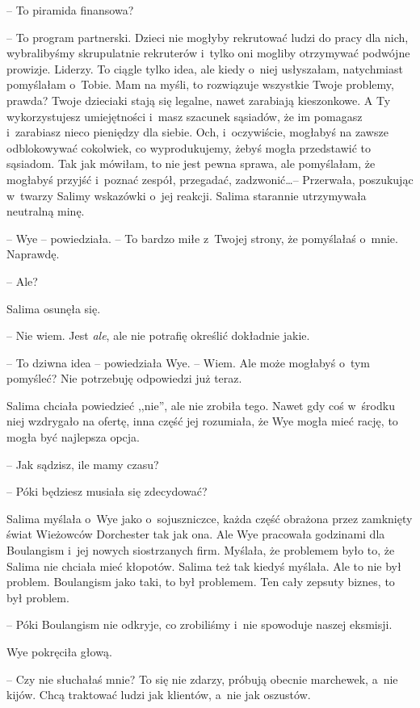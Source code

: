 \documentclass[oneside,polish,11pt,sfheadings]{mwbk}
\begin{document}
-- To piramida finansowa?

-- To program partnerski. Dzieci nie mogłyby rekrutować ludzi do pracy
dla nich, wybralibyśmy skrupulatnie rekruterów i~tylko oni mogliby
otrzymywać podwójne prowizje. Liderzy. To ciągle tylko idea, ale kiedy o~niej usłyszałam, natychmiast pomyślałam o~Tobie. Mam na myśli, to
rozwiązuje wszystkie Twoje problemy, prawda? Twoje dzieciaki stają się
legalne, nawet zarabiają kieszonkowe. A Ty wykorzystujesz umiejętności i~masz szacunek sąsiadów, że im pomagasz i~zarabiasz nieco pieniędzy dla
siebie. Och, i~oczywiście, mogłabyś na zawsze odblokowywać cokolwiek, co
wyprodukujemy, żebyś mogła przedstawić to sąsiadom. Tak jak mówiłam, to
nie jest pewna sprawa, ale pomyślałam, że mogłabyś przyjść i~poznać
zespół, przegadać, zadzwonić\ldots  -- Przerwała, poszukując w~twarzy Salimy
wskazówki o~jej reakcji. Salima starannie utrzymywała neutralną minę.

-- Wye -- powiedziała. -- To bardzo miłe z~Twojej strony, że pomyślałaś o~mnie. Naprawdę.

-- Ale?

Salima osunęła się. 

-- Nie wiem. Jest \textit{ale}, ale nie potrafię
określić dokładnie jakie.

-- To dziwna idea -- powiedziała Wye. -- Wiem. Ale może mogłabyś o~tym
pomyśleć? Nie potrzebuję odpowiedzi już teraz.

Salima chciała powiedzieć ,,nie'', ale nie zrobiła tego. Nawet gdy coś w~środku niej wzdrygało na ofertę, inna część jej rozumiała, że Wye mogła
mieć rację, to mogła być najlepsza opcja.

-- Jak sądzisz, ile mamy czasu?

-- Póki będziesz musiała się zdecydować?

Salima myślała o~Wye jako o~sojuszniczce, każda część obrażona przez
zamknięty świat Wieżowców Dorchester tak jak ona. Ale Wye pracowała
godzinami dla Boulangism i~jej nowych siostrzanych firm. Myślała, że
problemem było to, że Salima nie chciała mieć kłopotów. Salima też tak
kiedyś myślała. Ale to nie był problem. Boulangism jako taki, to był
problemem. Ten cały zepsuty biznes, to był problem.

-- Póki Boulangism nie odkryje, co zrobiliśmy i~nie spowoduje naszej
eksmisji.

Wye pokręciła głową. 

-- Czy nie słuchałaś mnie? To się nie zdarzy,
próbują obecnie marchewek, a~nie kijów. Chcą traktować ludzi jak
klientów, a~nie jak oszustów.
\end{document}
